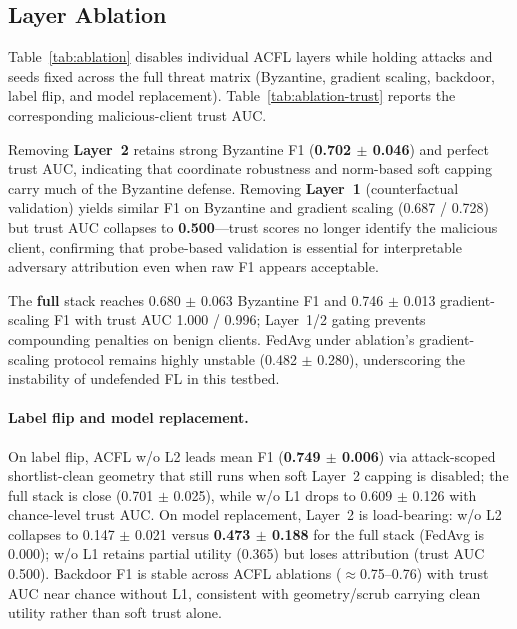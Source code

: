 \subsection{Layer Ablation}
\label{sec:exp-ablation}

Table~\ref{tab:ablation} disables individual ACFL layers while holding attacks and seeds fixed across the full threat matrix (Byzantine, gradient scaling, backdoor, label flip, and model replacement).
Table~\ref{tab:ablation-trust} reports the corresponding malicious-client trust AUC.

Removing \textbf{Layer~2} retains strong Byzantine F1 (\textbf{0.702 $\pm$ 0.046}) and perfect trust AUC, indicating that coordinate robustness and norm-based soft capping carry much of the Byzantine defense.
Removing \textbf{Layer~1} (counterfactual validation) yields similar F1 on Byzantine and gradient scaling (0.687 / 0.728) but trust AUC collapses to \textbf{0.500}---trust scores no longer identify the malicious client, confirming that probe-based validation is essential for interpretable adversary attribution even when raw F1 appears acceptable.

The \textbf{full} stack reaches 0.680 $\pm$ 0.063 Byzantine F1 and 0.746 $\pm$ 0.013 gradient-scaling F1 with trust AUC 1.000 / 0.996; Layer~1/2 gating prevents compounding penalties on benign clients.
FedAvg under ablation's gradient-scaling protocol remains highly unstable (0.482 $\pm$ 0.280), underscoring the instability of undefended FL in this testbed.

\paragraph{Label flip and model replacement.}
On label flip, ACFL w/o L2 leads mean F1 (\textbf{0.749 $\pm$ 0.006}) via attack-scoped shortlist-clean geometry that still runs when soft Layer~2 capping is disabled; the full stack is close (0.701 $\pm$ 0.025), while w/o L1 drops to 0.609 $\pm$ 0.126 with chance-level trust AUC.
On model replacement, Layer~2 is load-bearing: w/o L2 collapses to 0.147 $\pm$ 0.021 versus \textbf{0.473 $\pm$ 0.188} for the full stack (FedAvg is 0.000); w/o L1 retains partial utility (0.365) but loses attribution (trust AUC 0.500).
Backdoor F1 is stable across ACFL ablations ($\approx$0.75--0.76) with trust AUC near chance without L1, consistent with geometry/scrub carrying clean utility rather than soft trust alone.

